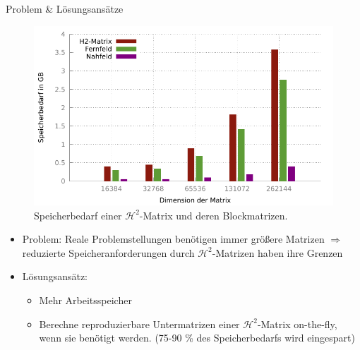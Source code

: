 \documentclass[10pt]{beamer}
\begin{document}
\begin{frame}{Problem \& Lösungsansätze}
  \begin{figure}
    \centering
    \includegraphics[width=.45\linewidth]{figures/fg-memory-h2-nf-ff.pdf}
    \caption{Speicherbedarf einer \(\mathcal{H}^2\)-Matrix und deren Blockmatrizen.}

  \end{figure}
  \begin{itemize}
    \item Problem: Reale Problemstellungen benötigen immer größere Matrizen
          \(\Rightarrow\) reduzierte Speicheranforderungen durch
          \(\mathcal{H}^2\)-Matrizen haben ihre Grenzen
    \item Lösungsansätz:
    \begin{itemize}
      \item Mehr Arbeitsspeicher
      \item Berechne reproduzierbare Untermatrizen einer
            \(\mathcal{H}^2\)-Matrix on-the-fly, wenn sie benötigt werden.
            (75-90 \% des Speicherbedarfs wird eingespart)
    \end{itemize}
  \end{itemize}
\end{frame}
\end{document}
